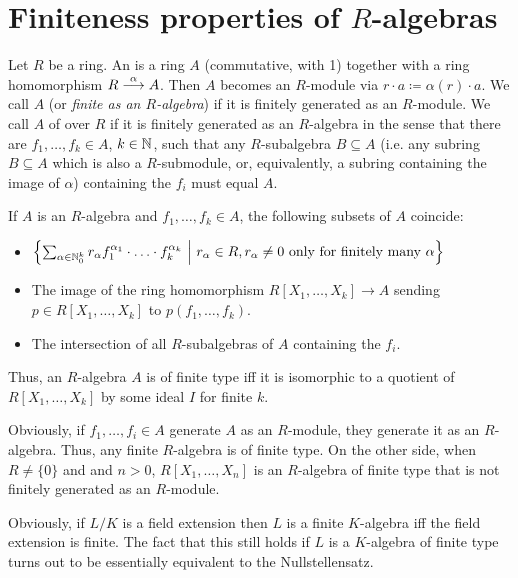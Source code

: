 \documentclass[a4paper,parskip=half,numbers=enddot, DIV=12]{scrreprt}
\begin{document}
	\section{Finiteness properties of \texorpdfstring{$R$}{R}-algebras}
	\begin{defi}
		Let $R$ be a ring. An  is a ring $A$ (commutative, with 1) together with a ring homomorphism $R\overset{\alpha}{\longrightarrow} A$. Then $A$ becomes an $R$-module via $r\cdot a \coloneqq \alpha(r) \cdot a$. We call $A$  (or \emph{finite as an $R$-algebra}) if it is finitely generated as an $R$-module. We call $A$ of  over $R$ if it is finitely generated as an $R$-algebra in the sense that there are $f_1,\ldots, f_k\in A$, $k\in \mathbb{N}$, such that any $R$-subalgebra $B\subseteq A$ (i.e. any subring $B\subseteq A$ which is also a $R$-submodule, or, equivalently, a subring containing the image of $\alpha$) containing the $f_i$ must equal $A$.
	\end{defi}
	\begin{rem}
		If $A$ is an $R$-algebra and $f_1,\ldots,f_k\in A$, the following subsets of $A$ coincide:
		\begin{itemize}
			\item $\left\{\sum_{\alpha\in\mathbb{N}_0^k} r_\alpha f_1^{\alpha_1}\cdot\ldots\cdot f_k^{\alpha_k}\ \middle|\  r_\alpha\in R, r_\alpha\neq 0 \text{ only for finitely many } \alpha\right\}$
			\item The image of the ring homomorphism $R[X_1,\ldots,X_k]\to A$ sending $p\in R[X_1,\ldots, X_k]$ to $p(f_1,\ldots,f_k)$.
			\item The intersection of all $R$-subalgebras of $A$ containing the $f_i$.
		\end{itemize}
		Thus, an $R$-algebra $A$ is of finite type iff it is isomorphic to a quotient of $R[X_1,\ldots, X_k]$ by some ideal $I$ for finite $k$.
	\end{rem}
	\begin{rem}
		\begin{alphanumerate}
			\item {}Obviously, if $f_1,\ldots, f_i\in A$ generate $A$ as an $R$-module, they generate it as an $R$-algebra. Thus, any finite $R$-algebra is of finite type. On the other side, when $R\neq \{0\}$ and and $n>0$, $R[X_1, \ldots, X_n]$ is an $R$-algebra of finite type that is not finitely generated as an $R$-module.
			\item Obviously, if $L/K$ is a field extension then $L$ is a finite $K$-algebra iff the field extension is finite. The fact that this still holds if $L$ is a $K$-algebra of finite type turns out to be essentially equivalent to the Nullstellensatz.
		\end{alphanumerate}
	\end{rem}
\end{document}
